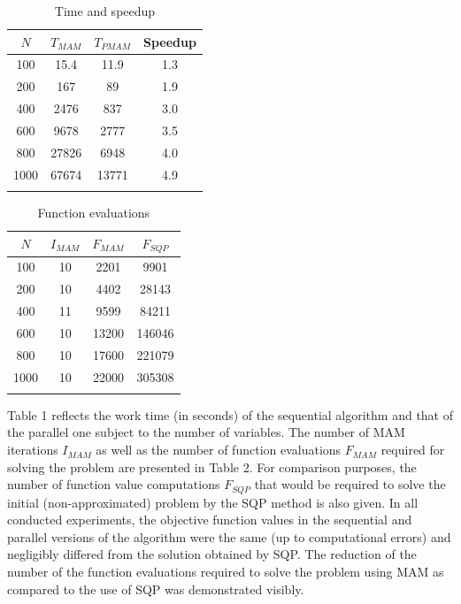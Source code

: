 \documentclass[runningheads,a4paper]{llncs}
\begin{document}
\begin{table}
	\caption{Time and speedup}
	\label{tab:1}
	\center
	\begin{tabular}{cccc}
		\hline\noalign{\smallskip}
		$N$ & $T_{MAM}$ & $T_{PMAM}$ & Speedup \\
		\hline\noalign{\smallskip}
		100 & 15.4 & 11.9 & 1.3  \\
		200 & 167 &  89 &  1.9 \\
		400 & 2476 &  837 &  3.0 \\
		600 & 9678 &  2777 &  3.5 \\
		800 & 27826 &  6948 &  4.0 \\
		1000 & 67674 &  13771 & 4.9  \\
		\noalign{\smallskip}\hline
	\end{tabular}
\end{table}

\begin{table}
	\caption{Function evaluations}
	\label{tab:2}
	\center
	\begin{tabular}{cccc}
		\hline\noalign{\smallskip}
		$N$ & $I_{MAM}$  & $F_{MAM}$ & $F_{SQP}$ \\
		\hline\noalign{\smallskip}
		100 & 10 &  2201 & 9901 \\
		200 & 10 &  4402 & 28143 \\
		400 & 11 &  9599 &  84211 \\
		600 & 10 &  13200 &  146046 \\
		800 & 10 &  17600 &  221079 \\
		1000 & 10 &  22000 & 305308 \\
		\noalign{\smallskip}\hline
	\end{tabular}
\end{table}

Table 1 reflects the work time (in seconds) of the sequential algorithm and
that of the parallel one subject to the number of variables. The number of MAM
iterations $I_{MAM}$ as well as the number of function evaluations $F_{MAM}$
required for solving the problem are presented in Table 2. For comparison
purposes, the number of function value computations $F_{SQP}$ that would be
required to solve the initial (non-approximated) problem by the SQP method is
also given. In all conducted experiments, the objective function values in the
sequential and parallel versions of the algorithm were the same (up to
computational errors) and negligibly differed from the solution obtained by
SQP. The reduction of the number of the function evaluations required to solve
the problem using MAM as compared to the use of SQP was demonstrated visibly.
\end{document}
